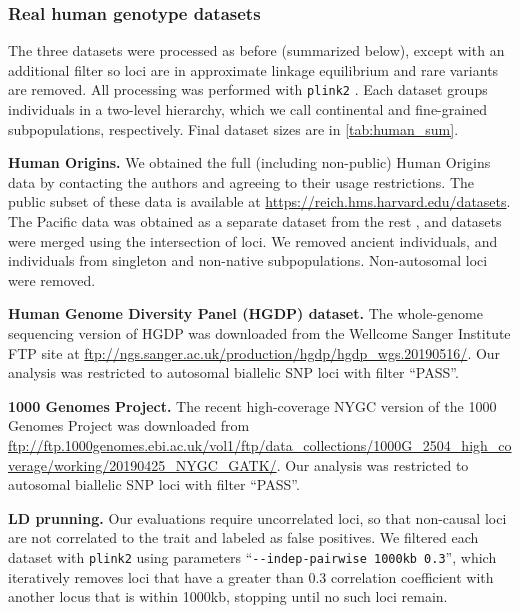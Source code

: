\documentclass[11pt]{article}
\begin{document}
\subsubsection{Real human genotype datasets}

The three datasets were processed as before \citep{ochoa_human} (summarized below), except with an additional filter so loci are in approximate linkage equilibrium and rare variants are removed.
All processing was performed with \texttt{plink2} \citep{chang_second-generation_2015}.
Each dataset groups individuals in a two-level hierarchy, which we call continental and fine-grained subpopulations, respectively.
Final dataset sizes are in \cref{tab:human_sum}.

\textbf{Human Origins.}
We obtained the full (including non-public) Human Origins data by contacting the authors and agreeing to their usage restrictions.
The public subset of these data is available at \url{https://reich.hms.harvard.edu/datasets}.
The Pacific data \citep{skoglund_genomic_2016} was obtained as a separate dataset from the rest \citep{lazaridis_ancient_2014,lazaridis_genomic_2016}, and datasets were merged using the intersection of loci.
We removed ancient individuals, and individuals from singleton and non-native subpopulations.
Non-autosomal loci were removed.

\textbf{Human Genome Diversity Panel (HGDP) dataset.}
The whole-genome sequencing version of HGDP \citep{bergstrom_insights_2020} was downloaded from the Wellcome Sanger Institute FTP site at \url{ftp://ngs.sanger.ac.uk/production/hgdp/hgdp_wgs.20190516/}.
Our analysis was restricted to autosomal biallelic SNP loci with filter ``PASS''.

\textbf{1000 Genomes Project.}
The recent high-coverage NYGC version of the 1000 Genomes Project \citep{fairley_international_2020} was downloaded from \url{ftp://ftp.1000genomes.ebi.ac.uk/vol1/ftp/data_collections/1000G_2504_high_coverage/working/20190425_NYGC_GATK/}.
Our analysis was restricted to autosomal biallelic SNP loci with filter ``PASS''.

\textbf{LD prunning.}
Our evaluations require uncorrelated loci, so that non-causal loci are not correlated to the trait and labeled as false positives.
We filtered each dataset with \texttt{plink2} using parameters ``\texttt{-{}-indep-pairwise 1000kb 0.3}'', which iteratively removes loci that have a greater than 0.3 correlation coefficient with another locus that is within 1000kb, stopping until no such loci remain.
\end{document}
